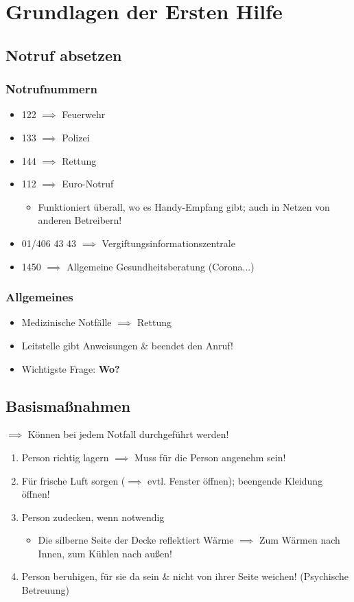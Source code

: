 \part{Grundlagen der Ersten Hilfe}
\chapter{Notruf absetzen}

\section{Notrufnummern}
\begin{itemize}
    \item 122 $\implies$ Feuerwehr
    \item 133 $\implies$ Polizei
    \item 144 $\implies$ Rettung
    \item 112 $\implies$ Euro-Notruf
    \begin{itemize}
        \item Funktioniert überall, wo es Handy-Empfang gibt; auch in Netzen von anderen Betreibern!
    \end{itemize}
    \item 01/406 43 43 $\implies$ Vergiftungsinformationszentrale
    \item 1450 $\implies$ Allgemeine Gesundheitsberatung (Corona...)
\end{itemize}

\section{Allgemeines}
\begin{itemize}
    \item Medizinische Notfälle $\implies$ Rettung
    \item Leitstelle gibt Anweisungen \& beendet den Anruf!
    \item Wichtigste Frage: \textbf{Wo?}
\end{itemize}

\chapter{Basismaßnahmen}
$\implies$ Können bei jedem Notfall durchgeführt werden!
\begin{enumerate}
    \item Person richtig lagern $\implies$ Muss für die Person angenehm sein!
    \item Für frische Luft sorgen ($\implies$ evtl. Fenster öffnen); beengende Kleidung öffnen!
    \item Person zudecken, wenn notwendig
    \begin{itemize}
        \item Die silberne Seite der Decke reflektiert Wärme $\implies$ Zum Wärmen nach Innen, zum Kühlen nach außen!
    \end{itemize}
    \item Person beruhigen, für sie da sein \& nicht von ihrer Seite weichen! (Psychische Betreuung)
\end{enumerate}

